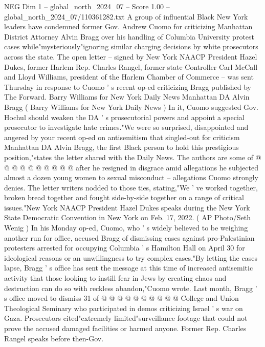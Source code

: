 \begin{textsample}{NEG Dim 1 – global\_north\_2024\_07 – Score 1.00 – global\_north\_2024\_07/110361282.txt}  \label{ex:f1_neg_270}
A group of influential Black New York leaders have condemned former Gov.
Andrew Cuomo for criticizing Manhattan District Attorney Alvin Bragg over his handling of Columbia University protest cases while"mysteriously"ignoring similar charging decisions by white prosecutors across the state.
The open letter -- signed by New York NAACP President Hazel Dukes, former Harlem Rep.
Charles Rangel, former state Controller Carl McCall and Lloyd Williams, president of the Harlem Chamber of Commerce -- was sent Thursday in response to Cuomo ' s recent op-ed criticizing Bragg published by The Forward.
Barry Williams for New York Daily News Manhattan DA Alvin Bragg ( Barry Williams for New York Daily News ) In it, Cuomo suggested Gov.
Hochul should weaken the DA ' s prosecutorial powers and appoint a special prosecutor to investigate hate crimes."We were so surprised, disappointed and angered by your recent op-ed on antisemitism that singled-out for criticism Manhattan DA Alvin Bragg, the first Black person to hold this prestigious position,"states the letter shared with the Daily News.
The authors are some of @ @ @ @ @ @ @ @ @ @ after he resigned in disgrace amid allegations he subjected almost a dozen young women to sexual misconduct -- allegations Cuomo strongly denies.
The letter writers nodded to those ties, stating,"We ' ve worked together, broken bread together and fought side-by-side together on a range of critical issues."New York NAACP President Hazel Dukes speaks during the New York State Democratic Convention in New York on Feb. 17, 2022. ( AP Photo/Seth Wenig ) In his Monday op-ed, Cuomo, who ' s widely believed to be weighing another run for office, accused Bragg of dismissing cases against pro-Palestinian protesters arrested for occupying Columbia ' s Hamilton Hall on April 30 for ideological reasons or an unwillingness to try complex cases."By letting the cases lapse, Bragg ' s office has sent the message at this time of increased antisemitic activity that those looking to instill fear in Jews by creating chaos and destruction can do so with reckless abandon,"Cuomo wrote.
Last month, Bragg ' s office moved to dismiss 31 of @ @ @ @ @ @ @ @ @ @ College and Union Theological Seminary who participated in demos criticizing Israel ' s war on Gaza.
Prosecutors cited"extremely limited"surveillance footage that could not prove the accused damaged facilities or harmed anyone.
Former Rep.
Charles Rangel speaks before then-Gov.

\end{textsample}
